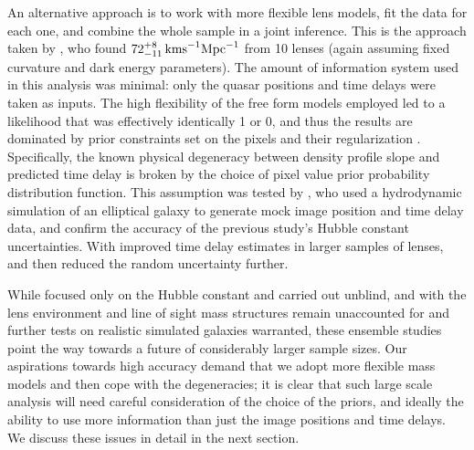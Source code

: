 An alternative approach is to work with more flexible lens models, fit
the data for each one, and combine the whole sample in a joint
inference.  This is the approach taken by \citet{Sah++06}, who found
$72^{+8}_{-11}\,{\rm km s}^{-1}{\rm Mpc}^{-1}$ from 10 lenses (again
assuming fixed curvature and dark energy parameters).
The amount of
information system used in this analysis was minimal: only the quasar
positions and time delays were taken as inputs. The high flexibility of the free
form models employed led to a likelihood that was effectively identically 1 or 0, and thus the
results are dominated by prior constraints set on the pixels and their
regularization \cite[see][for a description of pixel-lens in Bayesian
terms]{Col08}. Specifically, the known physical degeneracy between
density profile slope and predicted time delay
\citep{Wuc02,Suyu12} is broken by the choice of pixel value prior probability
distribution function. This assumption was tested by
\citet{Rea++07}, who used a hydrodynamic simulation of an elliptical
galaxy to generate mock image position and time delay data, and
confirm the accuracy of the previous study's Hubble constant
uncertainties. With improved time delay estimates in larger samples of
lenses, \cite{P+J10} and then \citet{RK++2015} reduced the random
uncertainty further.

While focused only on the Hubble constant and carried out unblind, and
with the lens environment and line of sight mass structures remain
unaccounted for and further tests on realistic simulated galaxies
warranted, these ensemble studies point the way towards a future of
considerably larger sample sizes. Our aspirations towards high accuracy
demand that we adopt more flexible mass models and then
cope with the degeneracies;
it is clear that such large
scale analysis will need careful consideration of the choice of the
priors, and ideally the ability to use more information than just the
image positions and time delays. We discuss these issues in detail in
the next section.
